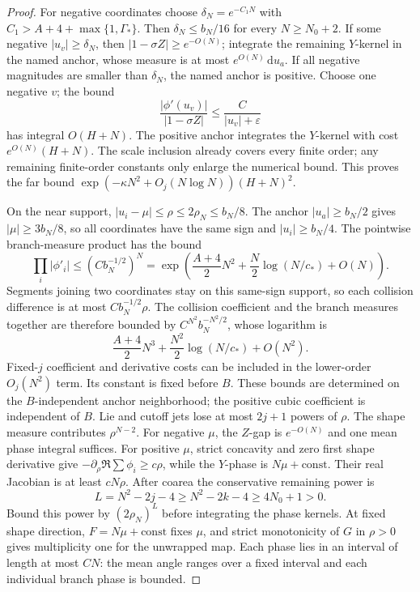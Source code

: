 \documentclass[11pt]{article}
\numberwithin{equation}{section}
\theoremstyle{definition}
\newcommand{\dd}{\,\mathrm d}
\newcommand{\eps}{\varepsilon}
\begin{document}
\begin{proof}
For negative coordinates choose \(\delta_N=e^{-C_1N}\) with
\(C_1>A+4+\max\{1,\Gamma_*\}\). Then \(\delta_N\le b_N/16\)
for every \(N\ge N_0+2\). If some negative \(|u_v|\ge\delta_N\), then
\(|1-\sigma Z|\ge e^{-O(N)}\); integrate the remaining \(Y\)-kernel
in the named anchor, whose measure is at most \(e^{O(N)}\dd u_a\).
If all negative magnitudes are smaller than \(\delta_N\), the
named anchor is positive. Choose one negative \(v\); the bound
\[
 \frac{|\phi'(u_v)|}{|1-\sigma Z|}\le\frac C{|u_v|+\eps}
\]
has integral \(O(H+N)\). The positive anchor integrates the
\(Y\)-kernel with cost \(e^{O(N)}(H+N)\).
The scale inclusion already covers every finite order; any
remaining finite-order constants only enlarge the numerical bound.
This proves the far bound
\(\exp(-\kappa N^2+O_j(N\log N))(H+N)^2\).

On the near support, \(|u_i-\mu|\le\rho\le2\rho_N\le b_N/8\).
The anchor \(|u_a|\ge b_N/2\) gives \(|\mu|\ge3b_N/8\), so
all coordinates have the same sign and \(|u_i|\ge b_N/4\).
The pointwise branch-measure product has the bound
\[
 \prod_i|\phi'_i|\le(Cb_N^{-1/2})^N
 =\exp\left(\frac{A+4}{2}N^2+
             \frac N2\log(N/c_*)+O(N)\right).
\]
Segments joining two coordinates stay on this same-sign support,
so each collision difference is at most \(Cb_N^{-1/2}\rho\).
The collision coefficient and the branch measures together are
therefore bounded by \(C^{N^2}b_N^{-N^2/2}\), whose logarithm is
\[
 \frac{A+4}{2}N^3+\frac{N^2}{2}\log(N/c_*)+O(N^2).
\]
Fixed-\(j\) coefficient and derivative costs can be included in
the lower-order \(O_j(N^2)\) term. Its constant is fixed before
\(B\). These bounds are determined
on the \(B\)-independent anchor neighborhood; the positive cubic
coefficient is independent of \(B\). Lie and cutoff jets lose at most
\(2j+1\) powers of \(\rho\).
The shape measure contributes \(\rho^{N-2}\).
For negative \(\mu\), the \(Z\)-gap is \(e^{-O(N)}\) and one mean
phase integral suffices.
For positive \(\mu\), strict concavity and zero first shape derivative
give \(-\partial_\rho\Re\sum\phi_i\ge c\rho\), while the \(Y\)-phase
is \(N\mu+\mathrm{const}\). Their real Jacobian is at least \(cN\rho\).
After coarea the conservative remaining power is
\[
 L=N^2-2j-4\ge N^2-2k-4\ge4N_0+1>0.
\]
Bound this power by \((2\rho_N)^L\) before integrating the phase
kernels. At fixed shape direction, \(F=N\mu+\mathrm{const}\) fixes
\(\mu\), and strict monotonicity of \(G\) in \(\rho>0\) gives
multiplicity one for the unwrapped map. Each phase lies in an
interval of length at most \(CN\): the mean angle ranges over a
fixed interval and each individual branch phase is bounded.

\end{proof}
\end{document}
